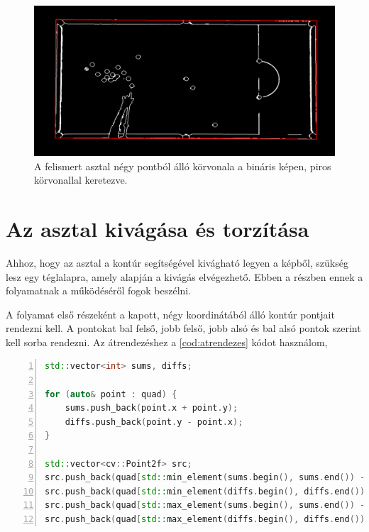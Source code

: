 \begin{figure}[!ht]
    \centering
    \includegraphics[width=140mm, keepaspectratio]{figures/input_screen_quad.png}
    \caption{A felismert asztal négy pontból álló körvonala a bináris képen, piros körvonallal keretezve.}
    \label{fig:bemeneti_kep_quad}
\end{figure}

\section{Az asztal kivágása és torzítása}
Ahhoz, hogy az asztal a kontúr segítségével kivágható legyen a képből, szükség lesz egy téglalapra, amely alapján a kivágás elvégezhető. Ebben a részben ennek a folyamatnak a működéséről fogok beszélni.
\par A folyamat első részeként a kapott, négy koordinátából álló kontúr pontjait rendezni kell. A pontokat bal felső, jobb felső, jobb alsó és bal alsó pontok szerint kell sorba rendezni.
\newline Az átrendezéshez a \ref{cod:atrendezes} kódot használom,

\vspace{2mm}
\hspace{-10mm}
\begin{minipage}{\linewidth}
\begin{lstlisting}[language=C++, numbers=left, caption={Átrendező algoritmus.}, label={cod:atrendezes}]
std::vector<int> sums, diffs;

for (auto& point : quad) {
    sums.push_back(point.x + point.y);
    diffs.push_back(point.y - point.x);
}

std::vector<cv::Point2f> src;
src.push_back(quad[std::min_element(sums.begin(), sums.end()) - sums.begin()]);
src.push_back(quad[std::min_element(diffs.begin(), diffs.end()) - diffs.begin()]);
src.push_back(quad[std::max_element(sums.begin(), sums.end()) - sums.begin()]);
src.push_back(quad[std::max_element(diffs.begin(), diffs.end()) - diffs.begin()]);
\end{lstlisting}
\end{minipage}

